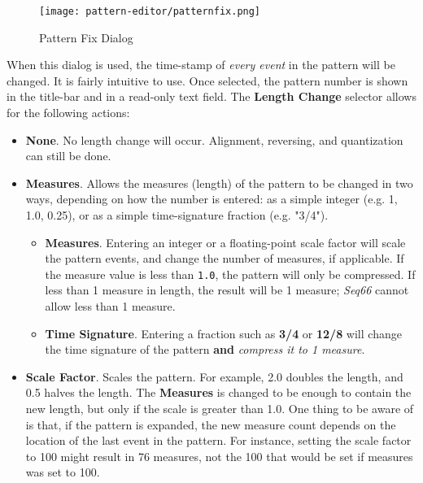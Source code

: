 \begin{figure}[H]
   \centering 
   \texttt{[image: pattern-editor/patternfix.png]}
   \caption{Pattern Fix Dialog}
   \label{fig:pattern_editor_pattern_fix}
\end{figure}

   When this dialog is used, the time-stamp of \textsl{every event} in the
   pattern will be changed.
   It is fairly intuitive to use.
   Once selected, the pattern number is shown in the title-bar and in a
   read-only text field.
   The \textbf{Length Change} selector allows for the following actions:

   \begin{itemize}
      \item \textbf{None}.
         No length change will occur.
         Alignment, reversing, and quantization can still be done.
      \item \textbf{Measures}.
         Allows the measures (length) of the pattern to be changed in two ways,
         depending on how the number is entered: as a simple integer (e.g.
         1, 1.0, 0.25),
         or as a simple time-signature fraction (e.g. "3/4").
         \begin{itemize}
            \item \textbf{Measures}.
               Entering an integer or a floating-point scale factor will scale
               the pattern events,
               and change the number of measures, if applicable.
               If the measure value is less than \texttt{1.0},
               the pattern will only be compressed.
               If less than 1 measure in length, the result will be
               1 measure; \textsl{Seq66} cannot allow less than 1 measure.
            \item \textbf{Time Signature}.
               Entering a fraction such as \textbf{3/4} or
               \textbf{12/8} will change the time signature of the pattern
               \textbf{and} \textsl{compress it to 1 measure}.
         \end{itemize}
      \item \textbf{Scale Factor}.
         Scales the pattern.  For example, 2.0 doubles the length, and 0.5
         halves the length.
         The \textbf{Measures} is changed to be enough to contain the new length,
         but only if the scale is greater than 1.0.
         One thing to be aware of is that, if the pattern is expanded, the
         new measure count depends on the location of the last event in the
         pattern. For instance, setting the scale factor to 100 might result in
         76 measures, not the 100 that would be set if measures was set to 100.
   \end{itemize}

